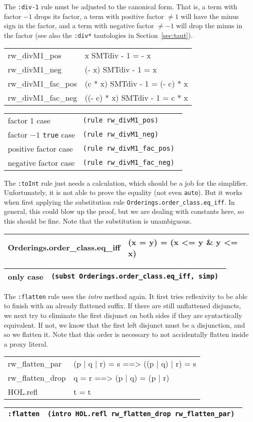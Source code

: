 \documentclass[10pt,a4paper]{article}
\newcommand{\ttt}{\texttt}
\newcommand{\true}{\ttt{true}\xspace}
\newenvironment{pt}[1]{\begin{center}\begin{tt}\begin{tabular}{#1}\hline}{\end{tabular}\end{tt}\end{center}}
\newcommand{\pl}[1]{#1 \\[1mm]}
\newcommand{\pll}[1]{#1 \\\hline}
\newenvironment{rt}{\begin{center}\begin{tabular}{|l l|}\hline}{\end{tabular}\end{center}}
\newcommand{\rl}[2]{\rm{#1} & \tt{#2} \\[1mm]}
\newcommand{\rll}[2]{\rm{#1} & \tt{#2} \\\hline}
\begin{document}
The \ttt{:div-1} rule must be adjusted to the canonical form. That is, a term with factor $-1$ drops its factor, a term with positive factor $\neq 1$ will have the minus sign in the factor, and a term with negative factor $\neq -1$ will drop the minus in the factor (see also the \ttt{:div*} tautologies in Section~\ref{sec:taut}).
%
\begin{pt}{ll}
	\pl{rw\_divM1\_pos & x SMTdiv - 1 = - x}
	\pl{rw\_divM1\_neg & (- x) SMTdiv - 1 = x}
	\pl{rw\_divM1\_fac\_pos & (c * x) SMTdiv - 1 = (- c) * x}
	\pll{rw\_divM1\_fac\_neg & ((- c) * x) SMTdiv - 1 = c * x}
\end{pt}
%
\begin{rt}
	\rl{factor 1 case}{(rule rw\_divM1\_pos)}
	\rl{factor $-1$ \true case}{(rule rw\_divM1\_neg)}
	\rl{positive factor case}{(rule rw\_divM1\_fac\_pos)}
	\rll{negative factor case}{(rule rw\_divM1\_fac\_neg)}
\end{rt}

The \ttt{:toInt} rule just needs a calculation, which should be a job for the simplifier. Unfortunately, it is not able to prove the equality (not even \ttt{auto}). But it works when first applying the substitution rule \ttt{Orderings.order\_class.eq\_iff}. In general, this could blow up the proof, but we are dealing with constants here, so this should be fine. Note that the substitution is unambiguous.
%
\begin{pt}{ll}
	\pll{Orderings.order\_class.eq\_iff & (x = y) = (x <= y \& y <= x)}
\end{pt}
%
\begin{rt}
	\rll{only case}{(subst Orderings.order\_class.eq\_iff, simp)}
\end{rt}

The \ttt{:flatten} rule uses the \emph{intro} method again. It first tries reflexivity to be able to finish with an already flattened suffix. If there are still unflattened disjuncts, we next try to eliminate the first disjunct on both sides if they are syntactically equivalent. If not, we know that the first left disjunct must be a disjunction, and so we flatten it. Note that this order is necessary to not accidentally flatten inside a proxy literal.
%
\begin{pt}{ll}
	\pl{rw\_flatten\_par & (p | q | r) = s ==> ((p | q) | r) = s}
	\pl{rw\_flatten\_drop & q = r ==> (p | q) = (p | r)}
	\pll{HOL.refl & t = t}
\end{pt}
%
\begin{rt}
	\rll{\ttt{:flatten}}{(intro HOL.refl rw\_flatten\_drop rw\_flatten\_par)}
\end{rt}
%
\end{document}
